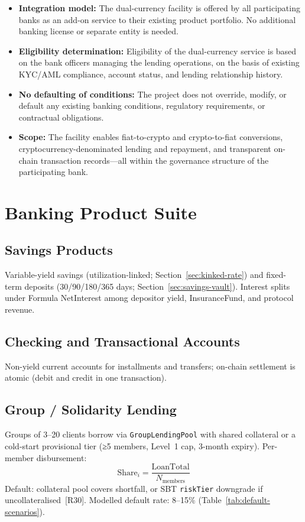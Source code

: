 \documentclass[12pt,a4paper]{report}
\begin{document}
\begin{itemize}[noitemsep]
\item \textbf{Integration model:} The dual-currency facility is offered by all participating banks as an add-on service to their existing product portfolio. No additional banking license or separate entity is needed.
\item \textbf{Eligibility determination:} Eligibility of the dual-currency service is based on the bank officers managing the lending operations, on the basis of existing KYC/AML compliance, account status, and lending relationship history.
\item \textbf{No defaulting of conditions:} The project does not override, modify, or default any existing banking conditions, regulatory requirements, or contractual obligations.
\item \textbf{Scope:} The facility enables fiat-to-crypto and crypto-to-fiat conversions, cryptocurrency-denominated lending and repayment, and transparent on-chain transaction records---all within the governance structure of the participating bank.
\end{itemize}

\section{Banking Product Suite}
\label{sec:banking-products}

\subsection{Savings Products}
Variable-yield savings (utilization-linked; Section~\ref{sec:kinked-rate}) and fixed-term deposits (30/90/180/365 days; Section~\ref{sec:savings-vault}). Interest splits under Formula NetInterest among depositor yield, InsuranceFund, and protocol revenue.

\subsection{Checking and Transactional Accounts}
Non-yield current accounts for installments and transfers; on-chain settlement is atomic (debit and credit in one transaction).

\subsection{Group / Solidarity Lending}
Groups of 3--20 clients borrow via \texttt{GroupLendingPool} with shared collateral or a cold-start provisional tier (≥5 members, Level~1 cap, 3-month expiry). Per-member disbursement:
\begin{equation}
\text{Share}_i = \frac{\text{LoanTotal}}{N_{\text{members}}}
\end{equation}
\noindent Default: collateral pool covers shortfall, or SBT \texttt{riskTier} downgrade if uncollateralised~[R30]. Modelled default rate: 8--15\% (Table~\ref{tab:default-scenarios}).
\end{document}
